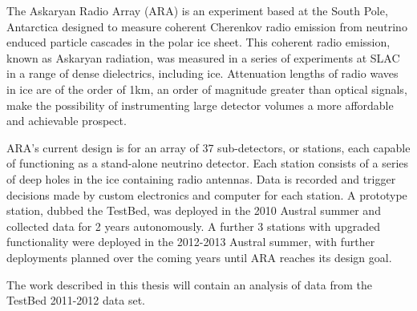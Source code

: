 The Askaryan Radio Array (ARA) is an experiment based at the South Pole, Antarctica designed to measure coherent Cherenkov radio emission from neutrino enduced particle cascades in the polar ice sheet. This coherent radio emission, known as Askaryan radiation, was measured in a series of experiments at SLAC in a range of dense dielectrics, including ice. Attenuation lengths of radio waves in ice are of the order of 1km, an order of magnitude greater than optical signals, make the possibility of instrumenting large detector volumes a more affordable and achievable prospect.

ARA's current design is for an array of 37 sub-detectors, or stations, each capable of functioning as a stand-alone neutrino detector. Each station consists of a series of deep holes in the ice containing radio antennas. Data is recorded and trigger decisions made by custom electronics and computer for each station. A prototype station, dubbed the TestBed, was deployed in the 2010 Austral summer and collected data for 2 years autonomously. A further 3 stations with upgraded functionality were deployed in the 2012-2013 Austral summer, with further deployments planned over the coming years until ARA reaches its design goal.

The work described in this thesis will contain an analysis of data from the TestBed 2011-2012 data set. 



